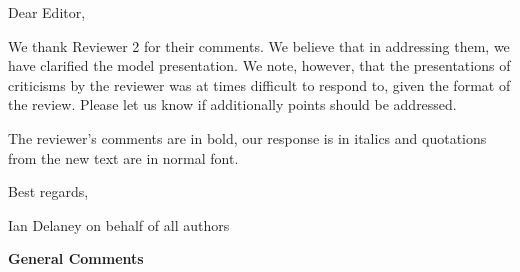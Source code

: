 \documentclass[11pt]{article}
\title{}
\author{}
\begin{document}
Dear Editor,

\vspace{.3cm}

We thank Reviewer 2 for their comments. We believe that in addressing them, we have clarified the model presentation. We note, however, that the presentations of criticisms by the reviewer was at times difficult to respond to, given the format of the review. Please let us know if additionally points should be addressed. 

The reviewer's comments are in bold, our response is in italics and quotations from the new text are in normal font.

\vspace{.3cm}

Best regards,

\vspace{.75cm}

Ian Delaney on behalf of all authors

\vspace{2cm}

\textbf{General Comments}
\end{document}
